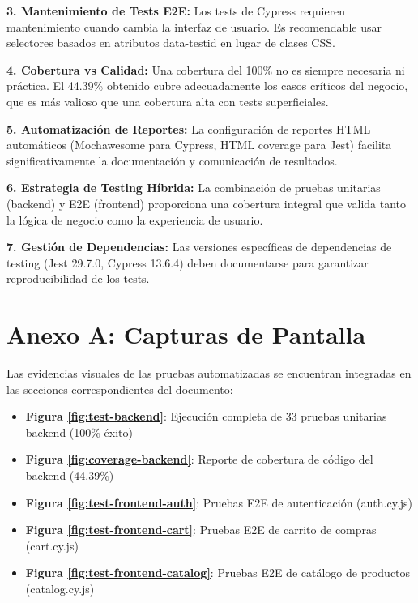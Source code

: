 \documentclass[12pt,a4paper]{article}
\begin{document}
\textbf{3. Mantenimiento de Tests E2E:} Los tests de Cypress requieren mantenimiento cuando cambia la interfaz de usuario. Es recomendable usar selectores basados en atributos data-testid en lugar de clases CSS.

\textbf{4. Cobertura vs Calidad:} Una cobertura del 100\% no es siempre necesaria ni práctica. El 44.39\% obtenido cubre adecuadamente los casos críticos del negocio, que es más valioso que una cobertura alta con tests superficiales.

\textbf{5. Automatización de Reportes:} La configuración de reportes HTML automáticos (Mochawesome para Cypress, HTML coverage para Jest) facilita significativamente la documentación y comunicación de resultados.

\textbf{6. Estrategia de Testing Híbrida:} La combinación de pruebas unitarias (backend) y E2E (frontend) proporciona una cobertura integral que valida tanto la lógica de negocio como la experiencia de usuario.

\textbf{7. Gestión de Dependencias:} Las versiones específicas de dependencias de testing (Jest 29.7.0, Cypress 13.6.4) deben documentarse para garantizar reproducibilidad de los tests.

\appendix
\section{Anexo A: Capturas de Pantalla}

Las evidencias visuales de las pruebas automatizadas se encuentran integradas en las secciones correspondientes del documento:

\begin{itemize}
    \item \textbf{Figura \ref{fig:test-backend}}: Ejecución completa de 33 pruebas unitarias backend (100\% éxito)
    \item \textbf{Figura \ref{fig:coverage-backend}}: Reporte de cobertura de código del backend (44.39\%)
    \item \textbf{Figura \ref{fig:test-frontend-auth}}: Pruebas E2E de autenticación (auth.cy.js)
    \item \textbf{Figura \ref{fig:test-frontend-cart}}: Pruebas E2E de carrito de compras (cart.cy.js)
    \item \textbf{Figura \ref{fig:test-frontend-catalog}}: Pruebas E2E de catálogo de productos (catalog.cy.js)
\end{itemize}
\end{document}

